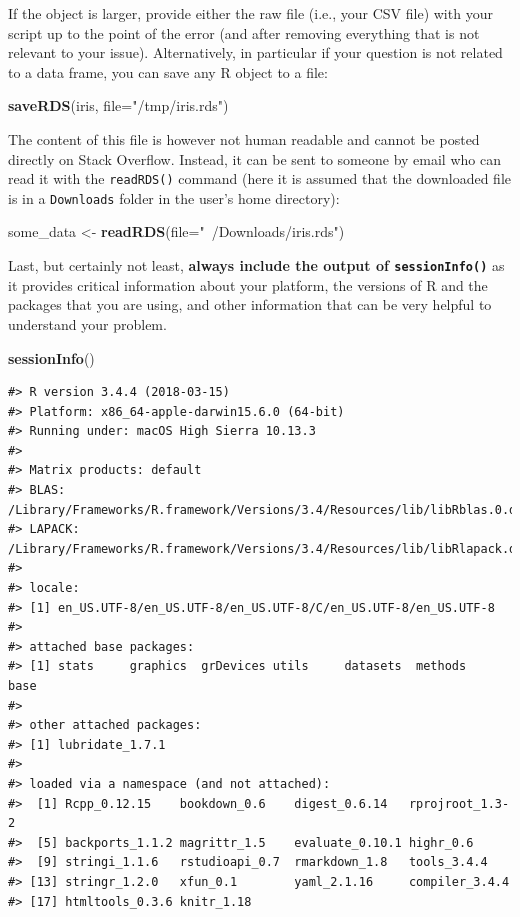 \documentclass[]{book}
\newenvironment{Shaded}{\begin{snugshade}}{\end{snugshade}}
\newcommand{\KeywordTok}[1]{\textcolor[rgb]{0.13,0.29,0.53}{\textbf{#1}}}
\newcommand{\DataTypeTok}[1]{\textcolor[rgb]{0.13,0.29,0.53}{#1}}
\newcommand{\StringTok}[1]{\textcolor[rgb]{0.31,0.60,0.02}{#1}}
\newcommand{\NormalTok}[1]{#1}
\theoremstyle{definition}
\theoremstyle{definition}
\theoremstyle{definition}
\theoremstyle{remark}
\begin{document}
If the object is larger, provide either the raw file (i.e., your CSV
file) with your script up to the point of the error (and after removing
everything that is not relevant to your issue). Alternatively, in
particular if your question is not related to a data frame, you can save
any R object to a file:

\begin{Shaded}
\begin{Highlighting}[]
\KeywordTok{saveRDS}\NormalTok{(iris, }\DataTypeTok{file=}\StringTok{"/tmp/iris.rds"}\NormalTok{)}
\end{Highlighting}
\end{Shaded}

The content of this file is however not human readable and cannot be
posted directly on Stack Overflow. Instead, it can be sent to someone by
email who can read it with the \texttt{readRDS()} command (here it is
assumed that the downloaded file is in a \texttt{Downloads} folder in
the user's home directory):

\begin{Shaded}
\begin{Highlighting}[]
\NormalTok{some_data <-}\StringTok{ }\KeywordTok{readRDS}\NormalTok{(}\DataTypeTok{file=}\StringTok{"~/Downloads/iris.rds"}\NormalTok{)}
\end{Highlighting}
\end{Shaded}

Last, but certainly not least, \textbf{always include the output of
\texttt{sessionInfo()}} as it provides critical information about your
platform, the versions of R and the packages that you are using, and
other information that can be very helpful to understand your problem.

\begin{Shaded}
\begin{Highlighting}[]
\KeywordTok{sessionInfo}\NormalTok{()}
\end{Highlighting}
\end{Shaded}

\begin{verbatim}
#> R version 3.4.4 (2018-03-15)
#> Platform: x86_64-apple-darwin15.6.0 (64-bit)
#> Running under: macOS High Sierra 10.13.3
#> 
#> Matrix products: default
#> BLAS: /Library/Frameworks/R.framework/Versions/3.4/Resources/lib/libRblas.0.dylib
#> LAPACK: /Library/Frameworks/R.framework/Versions/3.4/Resources/lib/libRlapack.dylib
#> 
#> locale:
#> [1] en_US.UTF-8/en_US.UTF-8/en_US.UTF-8/C/en_US.UTF-8/en_US.UTF-8
#> 
#> attached base packages:
#> [1] stats     graphics  grDevices utils     datasets  methods   base     
#> 
#> other attached packages:
#> [1] lubridate_1.7.1
#> 
#> loaded via a namespace (and not attached):
#>  [1] Rcpp_0.12.15    bookdown_0.6    digest_0.6.14   rprojroot_1.3-2
#>  [5] backports_1.1.2 magrittr_1.5    evaluate_0.10.1 highr_0.6      
#>  [9] stringi_1.1.6   rstudioapi_0.7  rmarkdown_1.8   tools_3.4.4    
#> [13] stringr_1.2.0   xfun_0.1        yaml_2.1.16     compiler_3.4.4 
#> [17] htmltools_0.3.6 knitr_1.18
\end{verbatim}
\end{document}
